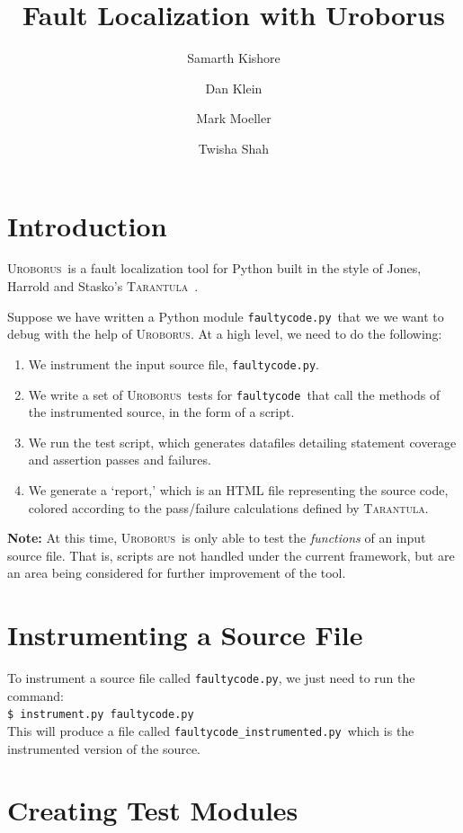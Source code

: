 \documentclass[english]{article}
\title{Fault Localization with Uroborus}
\author{Samarth Kishore
\and 
Dan Klein
\and 
Mark Moeller
\and 
Twisha Shah
}
\newcommand{\Uro}{\textsc{Uroborus}}
\newcommand{\Taran}{\textsc{Tarantula}}
\newcommand{\fc}{\texttt{faultycode}}
\newcommand{\fcp}{\texttt{faultycode.py}}
\newcommand{\fcip}{\texttt{faultycode\_instrumented.py}}
\begin{document}
\maketitle


\section{Introduction}

\Uro\ is a fault localization tool for Python built in the style of Jones, Harrold and Stasko's
\Taran ~\cite{Jones}.

Suppose we have written a Python module \fcp\ that we we want to debug with the
help of \Uro. At a high level, we need to do the following:
\begin{enumerate}
\item We instrument the input source file, \fcp.
\item We write a set of \Uro\ tests for \fc\ that call the methods of the instrumented source, in the
form of a script.
\item We run the test script, which generates datafiles detailing statement coverage and assertion
passes and failures.
\item We generate a `report,' which is an HTML file representing the source code, colored according
to the pass/failure calculations defined by \Taran.
\end{enumerate}
\textbf{Note:} At this time, \Uro\ is only able to test the \emph{functions} of an
input source file. That is, scripts are not handled under the current framework, but are an area being
considered for further improvement of the tool.

\section{Instrumenting a Source File}

To instrument a source file called \fcp, we just need to run the command:\\

\texttt{\$ instrument.py }\fcp\ \\

This will produce a file called \fcip\  which is the instrumented version of the source.

\section{Creating Test Modules}
\end{document}
